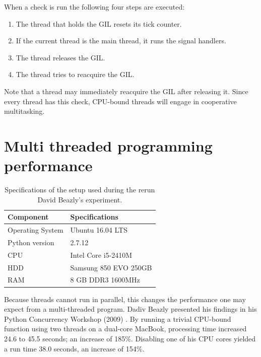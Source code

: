 

When a check is run the following four steps are executed:
\begin{enumerate}
	\item The thread that holds the GIL resets its tick counter.
	\item If the current thread is the main thread, it runs the signal handlers.
	\item The thread releases the GIL.
	\item The thread tries to reacquire the GIL.
\end{enumerate}

Note that a thread may immediately reacquire the GIL after releasing it.
Since every thread has this check, CPU-bound threads will engage in cooperative multitasking.

\section{Multi threaded programming performance}
\label{sct:multi_theaded_programming_performance}

\begin{table}[h]
	\centering
	\caption{Specifications of the setup used during the rerun David Beazly's experiment.}
	\label{table:rerun_beazily}
	\begin{tabular}{l|l}
		\textbf{Component} 	& \textbf{Specifications} \\ \hline
		Operating System   	& Ubuntu 16.04 LTS \\
		Python version		& 2.7.12 \\
		CPU					& Intel Core i5-2410M \\ 
		HDD					& Samsung 850 EVO 250GB  \\ 
		RAM					& 8 GB DDR3 1600MHz \\
	\end{tabular}
\end{table}

Because threads cannot run in parallel, this changes the performance one may expect from a multi-threaded program.
Dadiv Beazly presented his findings in his Python Concurrency Workshop (2009) \cite{beazley2009inside}.
By running a trivial CPU-bound function using two threads on a dual-core MacBook, processing time increased 24.6 to 45.5 seconds; an increase of 185\%.
Disabling one of his CPU cores yielded a run time 38.0 seconds, an increase of 154\%.

